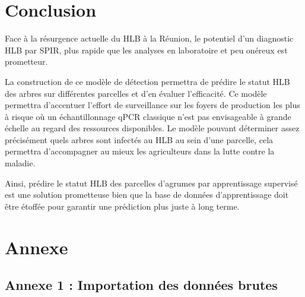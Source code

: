 \documentclass[
  11pt,
  french,
  a4paper,
  extrafontsizes,onecolumn,openright
  ]{memoir}
\begin{document}
\hypertarget{conclusion}{%
\chapter{Conclusion}\label{conclusion}}

Face à la résurgence actuelle du HLB à la Réunion, le potentiel d'un diagnostic HLB par SPIR, plus rapide que les analyses en laboratoire et peu onéreux est prometteur.

La construction de ce modèle de détection permettra de prédire le statut HLB des arbres sur différentes parcelles et d'en évaluer l'efficacité. Ce modèle permettra d'accentuer l'effort de surveillance sur les foyers de production les plus à risque où un échantillonnage qPCR classique n'est pas envisageable à grande échelle au regard des ressources disponibles.
Le modèle pouvant déterminer assez précisément quels arbres sont infectés au HLB au sein d'une parcelle, cela permettra d'accompagner au mieux les agriculteurs dans la lutte contre la maladie.

Ainsi, prédire le statut HLB des parcelles d'agrumes par apprentissage supervisé est une solution prometteuse bien que la base de données d'apprentissage doit être étoffée pour garantir une prédiction plus juste à long terme.

\hypertarget{annexe}{%
\chapter{Annexe}\label{annexe}}

\scriptsize

\normalsize

\vfill
\newpage
\SmallMargins

\hypertarget{annexe-1-importation-des-donnuxe9es-brutes}{%
\section{Annexe 1 : Importation des données brutes}\label{annexe-1-importation-des-donnuxe9es-brutes}}

\scriptsize
\end{document}
